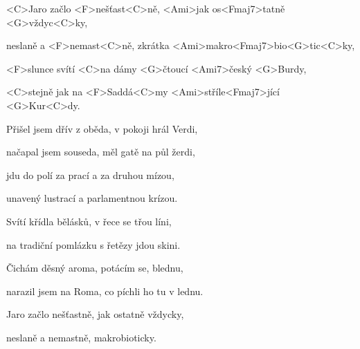 

\zs
<C>Jaro začlo <F>nešťast<C>ně, <Ami>jak os<Fmaj7>tatně <G>vždyc<C>ky,

neslaně a <F>nemast<C>ně, zkrátka <Ami>makro<Fmaj7>bio<G>tic<C>ky,

<F>slunce svítí <C>na dámy <G>čtoucí <Ami7>český <G>Burdy,

<C>stejně jak na <F>Saddá<C>my <Ami>stříle<Fmaj7>jící <G>Kur<C>dy.

\ks

\zs
Přišel jsem dřív z oběda, v pokoji hrál Verdi,

načapal jsem souseda, měl gatě na půl žerdi,

jdu do polí za prací a za druhou mízou,

unavený lustrací a parlamentnou krízou.

\ks

\zs
Svítí křídla bělásků, v řece se třou líni,

na tradiční pomlázku s řetězy jdou skini.

Čichám děsný aroma, potácím se, blednu,

narazil jsem na Roma, co píchli ho tu v lednu.

\ks

\zs
Jaro začlo nešťastně, jak ostatně vždycky,

neslaně a nemastně, makrobioticky.
\ks

\kp
